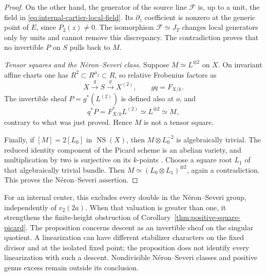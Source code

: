 \begin{proof}
On the other hand, the generator of the source line
$\mathcal F$ is, up to a unit, the field in
\eqref{eq:internal-cartier-local-field}. Its $\partial_z$
coefficient is nonzero at the generic point of $E$, since
$P_2(z)\ne0$. The isomorphism $\mathcal F\simeq J_T$ changes
local generators only by units and cannot remove this discrepancy.
The contradiction proves that no invertible $P$ on $S$ pulls
back to $M$.

\emph{Tensor squares and the N\'eron--Severi class.}
Suppose $M\simeq L^{\otimes2}$ on $X$. On invariant affine
charts one has $R^2\subset R^{\mu_2}\subset R$, so relative
Frobenius factors as
\[
 X\xrightarrow{q}S\xrightarrow{g}X^{(2)},
 \qquad gq=F_{X/k}.
\]
The invertible sheaf $P=g^*(L^{(2)})$ is defined also at $o$,
and
\[
 q^*P=F_{X/k}^*L^{(2)}\simeq L^{\otimes2}\simeq M,
\]
contrary to what was just proved. Hence $M$ is not a tensor square.

Finally, if $[M]=2[L_0]$ in $\operatorname{NS}(X)$, then
$M\otimes L_0^{-2}$ is algebraically trivial. The reduced identity
component of the Picard scheme is an abelian variety, and
multiplication by two is surjective on its $k$-points
\cite[Theorems~2.5 and~5.4, Proposition~5.10 and Remark~5.25]{KleimanPicard}
\cite[Tag~03RP, parts~(3)--(4)]{Stacks}.
Choose a square root $L_1$ of that algebraically trivial bundle.
Then $M\simeq(L_0\otimes L_1)^{\otimes2}$, again a contradiction.
This proves the N\'eron--Severi assertion.
\end{proof}

For an internal center, this excludes every double in the
N\'eron--Severi group, independently of $v_2(2a)$. When that
valuation is greater than one, it strengthens the finite-height
obstruction of Corollary~\ref{thm:positive-square-picard}.
The proposition concerns descent as an invertible sheaf on the
singular quotient. A linearization can have different stabilizer
characters on the fixed divisor and at the isolated fixed point;
the proposition does not identify every linearization with such
a descent. Nondivisible N\'eron--Severi classes and positive genus
excess remain outside its conclusion.
